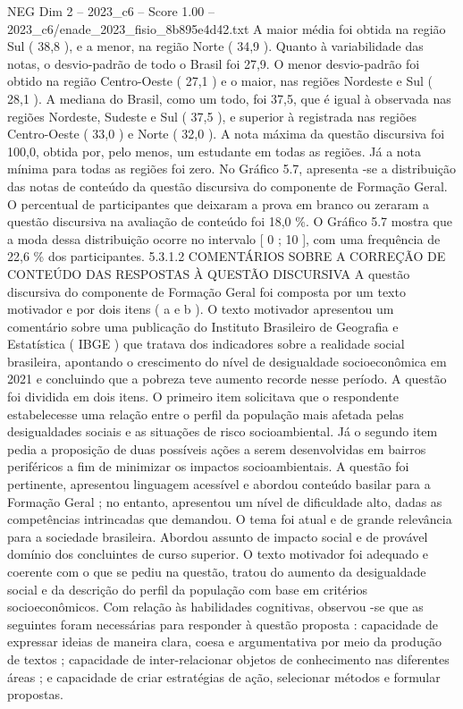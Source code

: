 \begin{textsample}{NEG Dim 2 – 2023\_c6 – Score 1.00 – 2023\_c6/enade\_2023\_fisio\_8b895e4d42.txt}
A maior média foi obtida na região Sul ( 38,8 ), e a menor, na região Norte ( 34,9 ).
Quanto à variabilidade das notas, o desvio-padrão de todo o Brasil foi 27,9.
O menor desvio-padrão foi obtido na região Centro-Oeste ( 27,1 ) e o maior, nas regiões Nordeste e Sul ( 28,1 ).
A mediana do Brasil, como um todo, foi 37,5, que é igual à observada nas regiões Nordeste, Sudeste e Sul ( 37,5 ), e superior à registrada nas regiões Centro-Oeste ( 33,0 ) e Norte ( 32,0 ).
A nota máxima da questão discursiva foi 100,0, obtida por, pelo menos, um estudante em todas as regiões.
Já a nota mínima para todas as regiões foi zero.
No Gráfico 5.7, apresenta -se a distribuição das notas de conteúdo da questão discursiva do componente de Formação Geral.
O percentual de participantes que deixaram a prova em branco ou zeraram a questão discursiva na avaliação de conteúdo foi 18,0 \%.
O Gráfico 5.7 mostra que a moda dessa distribuição ocorre no intervalo [ 0 ; 10 ], com uma frequência de 22,6 \% dos participantes. 5.3.1.2 COMENTÁRIOS SOBRE A CORREÇÃO DE CONTEÚDO DAS RESPOSTAS À QUESTÃO DISCURSIVA A questão discursiva do componente de Formação Geral foi composta por um texto motivador e por dois itens ( a e b ).
O texto motivador apresentou um comentário sobre uma publicação do Instituto Brasileiro de Geografia e Estatística ( IBGE ) que tratava dos indicadores sobre a realidade social brasileira, apontando o crescimento do nível de desigualdade socioeconômica em 2021 e concluindo que a pobreza teve aumento recorde nesse período.
A questão foi dividida em dois itens.
O primeiro item solicitava que o respondente estabelecesse uma relação entre o perfil da população mais afetada pelas desigualdades sociais e as situações de risco socioambiental.
Já o segundo item pedia a proposição de duas possíveis ações a serem desenvolvidas em bairros periféricos a fim de minimizar os impactos socioambientais.
A questão foi pertinente, apresentou linguagem acessível e abordou conteúdo basilar para a Formação Geral ; no entanto, apresentou um nível de dificuldade alto, dadas as competências intrincadas que demandou.
O tema foi atual e de grande relevância para a sociedade brasileira.
Abordou assunto de impacto social e de provável domínio dos concluintes de curso superior.
O texto motivador foi adequado e coerente com o que se pediu na questão, tratou do aumento da desigualdade social e da descrição do perfil da população com base em critérios socioeconômicos.
Com relação às habilidades cognitivas, observou -se que as seguintes foram necessárias para responder à questão proposta : capacidade de expressar ideias de maneira clara, coesa e argumentativa por meio da produção de textos ; capacidade de inter-relacionar objetos de conhecimento nas diferentes áreas ; e capacidade de criar estratégias de ação, selecionar métodos e formular propostas.

\end{textsample}
